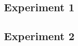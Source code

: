 \subsection{Experiment 1} %
\label{sub:experiment_1}


\subsection{Experiment 2} %
\label{sub:experiment_2}

